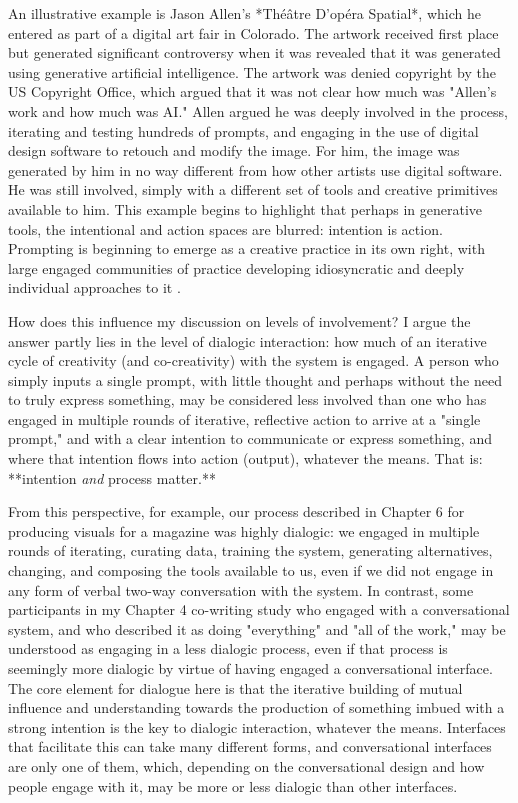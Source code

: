 An illustrative example is Jason Allen's *Théâtre D'opéra Spatial*, which he entered as part of a digital art fair in Colorado. The artwork received first place but generated significant controversy when it was revealed that it was generated using generative artificial intelligence. The artwork was denied copyright by the US Copyright Office, which argued that it was not clear how much was "Allen's work and how much was AI." Allen argued he was deeply involved in the process, iterating and testing hundreds of prompts, and engaging in the use of digital design software to retouch and modify the image. For him, the image was generated by him in no way different from how other artists use digital software. He was still involved, simply with a different set of tools and creative primitives available to him. This example begins to highlight that perhaps in generative tools, the intentional and action spaces are blurred: intention is action. Prompting is beginning to emerge as a creative practice in its own right, with large engaged communities of practice developing idiosyncratic and deeply individual approaches to it \cite{Chang2023-tv}.

How does this influence my discussion on levels of involvement? I argue the answer partly lies in the level of dialogic interaction: how much of an iterative cycle of creativity (and co-creativity) with the system is engaged. A person who simply inputs a single prompt, with little thought and perhaps without the need to truly express something, may be considered less involved than one who has engaged in multiple rounds of iterative, reflective action to arrive at a "single prompt," and with a clear intention to communicate or express something, and where that intention flows into action (output), whatever the means. That is: **intention \textit{and} process matter.**

From this perspective, for example, our process described in Chapter 6 for producing visuals for a magazine was highly dialogic: we engaged in multiple rounds of iterating, curating data, training the system, generating alternatives, changing, and composing the tools available to us, even if we did not engage in any form of verbal two-way conversation with the system. In contrast, some participants in my Chapter 4 co-writing study who engaged with a conversational system, and who described it as doing "everything" and "all of the work," may be understood as engaging in a less dialogic process, even if that process is seemingly more dialogic by virtue of having engaged a conversational interface. The core element for dialogue here is that the iterative building of mutual influence and understanding towards the production of something imbued with a strong intention is the key to dialogic interaction, whatever the means. Interfaces that facilitate this can take many different forms, and conversational interfaces are only one of them, which, depending on the conversational design and how people engage with it, may be more or less dialogic than other interfaces.


